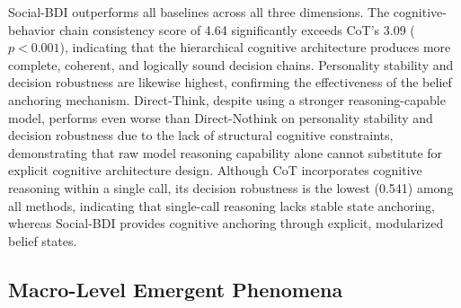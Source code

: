 \documentclass[a4paper,fleqn]{cas-dc}
\begin{document}
\begin{table}[!t]
\centering
\caption{Micro-level behavioral mechanism validation results (mean$\pm$std).}
\label{tab:micro}
\renewcommand{\arraystretch}{1.05}
\end{table}

Social-BDI outperforms all baselines across all three dimensions. The cognitive-behavior chain consistency score of 4.64 significantly exceeds CoT's 3.09 ($p < 0.001$), indicating that the hierarchical cognitive architecture produces more complete, coherent, and logically sound decision chains. Personality stability and decision robustness are likewise highest, confirming the effectiveness of the belief anchoring mechanism. Direct-Think, despite using a stronger reasoning-capable model, performs even worse than Direct-Nothink on personality stability and decision robustness due to the lack of structural cognitive constraints, demonstrating that raw model reasoning capability alone cannot substitute for explicit cognitive architecture design. Although CoT incorporates cognitive reasoning within a single call, its decision robustness is the lowest (0.541) among all methods, indicating that single-call reasoning lacks stable state anchoring, whereas Social-BDI provides cognitive anchoring through explicit, modularized belief states.

\subsection{Macro-Level Emergent Phenomena}\label{subsec:macro}
\end{document}
